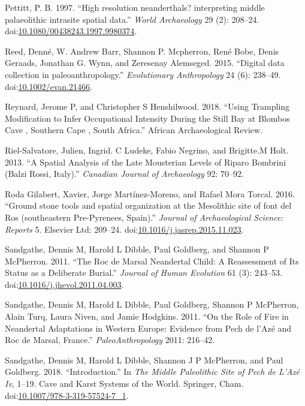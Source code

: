 \documentclass[smallextended]{svjour3}       %
\begin{document}
\hypertarget{ref-Pettitt1997a}{}
Pettitt, P. B. 1997. ``High resolution neanderthals? interpreting middle
palaeolithic intrasite spatial data.'' \emph{World Archaeology} 29 (2):
208--24.
doi:\href{https://doi.org/10.1080/00438243.1997.9980374}{10.1080/00438243.1997.9980374}.

\hypertarget{ref-Reed2015}{}
Reed, Denné, W. Andrew Barr, Shannon P. Mcpherron, René Bobe, Denis
Geraads, Jonathan G. Wynn, and Zeresenay Alemseged. 2015. ``Digital data
collection in paleoanthropology.'' \emph{Evolutionary Anthropology} 24
(6): 238--49.
doi:\href{https://doi.org/10.1002/evan.21466}{10.1002/evan.21466}.

\hypertarget{ref-Reynard2018}{}
Reynard, Jerome P, and Christopher S Henshilwood. 2018. ``Using
Trampling Modification to Infer Occupational Intensity During the Still
Bay at Blombos Cave , Southern Cape , South Africa.'' African
Archaeological Review.

\hypertarget{ref-Riel-Salvatore2013}{}
Riel-Salvatore, Julien, Ingrid. C Ludeke, Fabio Negrino, and Brigitte.M
Holt. 2013. ``A Spatial Analysis of the Late Mousterian Levels of Riparo
Bombrini (Balzi Rossi, Italy).'' \emph{Canadian Journal of Archaeology}
92: 70--92.

\hypertarget{ref-RodaGilabert2016}{}
Roda Gilabert, Xavier, Jorge Martínez-Moreno, and Rafael Mora Torcal.
2016. ``Ground stone tools and spatial organization at the Mesolithic
site of font del Ros (southeastern Pre-Pyrenees, Spain).'' \emph{Journal
of Archaeological Science: Reports} 5. Elsevier Ltd: 209--24.
doi:\href{https://doi.org/10.1016/j.jasrep.2015.11.023}{10.1016/j.jasrep.2015.11.023}.

\hypertarget{ref-sandgathe_roc_2011}{}
Sandgathe, Dennis M, Harold L Dibble, Paul Goldberg, and Shannon P
McPherron. 2011. ``The Roc de Marsal Neandertal Child: A Reassessment of
Its Status as a Deliberate Burial.'' \emph{Journal of Human Evolution}
61 (3): 243--53.
doi:\href{https://doi.org/10.1016/j.jhevol.2011.04.003}{10.1016/j.jhevol.2011.04.003}.

\hypertarget{ref-sandgathe_role_2011}{}
Sandgathe, Dennis M, Harold L Dibble, Paul Goldberg, Shannon P
McPherron, Alain Turq, Laura Niven, and Jamie Hodgkins. 2011. ``On the
Role of Fire in Neandertal Adaptations in Western Europe: Evidence from
Pech de l'Azé and Roc de Marsal, France.'' \emph{PaleoAnthropology}
2011: 216--42.

\hypertarget{ref-sandgathe_introduction_2018}{}
Sandgathe, Dennis M, Harold L Dibble, Shannon J P McPherron, and Paul
Goldberg. 2018. ``Introduction.'' In \emph{The Middle Paleolithic Site
of Pech de L'Azé Iv}, 1--19. Cave and Karst Systems of the World.
Springer, Cham.
doi:\href{https://doi.org/10.1007/978-3-319-57524-7_1}{10.1007/978-3-319-57524-7\_1}.
\end{document}
